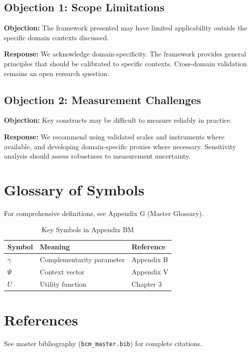 \subsection{Objection 1: Scope Limitations}

\textbf{Objection:} The framework presented may have limited applicability
outside the specific domain contexts discussed.

\textbf{Response:} We acknowledge domain-specificity. The framework provides
general principles that should be calibrated to specific contexts. Cross-domain
validation remains an open research question.

\subsection{Objection 2: Measurement Challenges}

\textbf{Objection:} Key constructs may be difficult to measure reliably in
practice.

\textbf{Response:} We recommend using validated scales and instruments where
available, and developing domain-specific proxies where necessary. Sensitivity
analysis should assess robustness to measurement uncertainty.



\section{Glossary of Symbols}
\label{sec:bm-glossary}

For comprehensive definitions, see Appendix G (Master Glossary).

\begin{table}[htbp]
\centering
\caption{Key Symbols in Appendix BM}
\begin{tabular}{lll}
\toprule
\textbf{Symbol} & \textbf{Meaning} & \textbf{Reference} \\
\midrule
$\gamma$ & Complementarity parameter & Appendix B \\
$\Psi$ & Context vector & Appendix V \\
$U$ & Utility function & Chapter 3 \\
\bottomrule
\end{tabular}
\end{table}


\section{References}
\label{sec:references}

See master bibliography (\texttt{bcm\_master.bib}) for complete citations.

\nocite{bcm_master}


